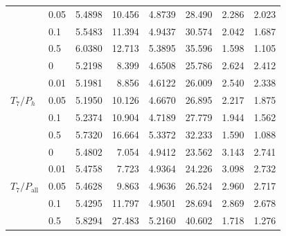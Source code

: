 \begin{table}[H]
\begin{tabular}{@{}llrrrrrr@{}}
 & 0.05 & 5.4898 & 10.456 & 4.8739 & 28.490 & 2.286 & 2.023 \\
 & 0.1 & 5.5483 & 11.394 & 4.9437 & 30.574 & 2.042 & 1.687 \\
 & 0.5 & 6.0380 & 12.713 & 5.3895 & 35.596 & 1.598 & 1.105 \\
\midrule
\multirow{5}{*}{$T_{7}/P_{h}$} & 0 & 5.2198 & 8.399 & 4.6508 & 25.786 & 2.624 & 2.412 \\
 & 0.01 & 5.1981 & 8.856 & 4.6122 & 26.009 & 2.540 & 2.338 \\
 & 0.05 & 5.1950 & 10.126 & 4.6670 & 26.895 & 2.217 & 1.875 \\
 & 0.1 & 5.2374 & 10.904 & 4.7189 & 27.779 & 1.944 & 1.562 \\
 & 0.5 & 5.7320 & 16.664 & 5.3372 & 32.233 & 1.590 & 1.088 \\
\midrule
\multirow{5}{*}{$T_{7}/P_{\mathrm{all}}$} & 0 & 5.4802 & 7.054 & 4.9412 & 23.562 & 3.143 & 2.741 \\
 & 0.01 & 5.4758 & 7.723 & 4.9364 & 24.226 & 3.098 & 2.732 \\
 & 0.05 & 5.4628 & 9.863 & 4.9636 & 26.524 & 2.960 & 2.717 \\
 & 0.1 & 5.4295 & 11.797 & 4.9501 & 28.694 & 2.869 & 2.678 \\
 & 0.5 & 5.8294 & 27.483 & 5.2160 & 40.602 & 1.718 & 1.276 \\
\bottomrule
\end{tabular}
\end{table}
